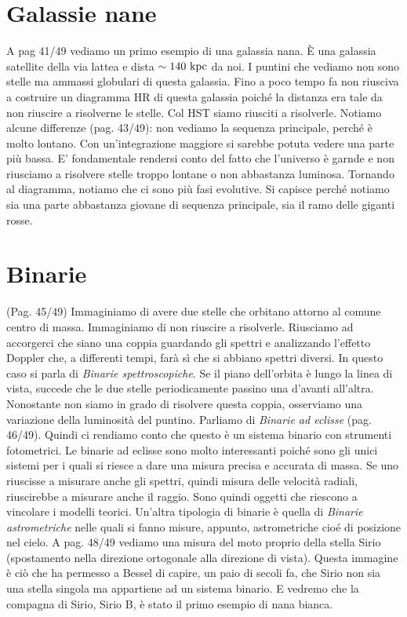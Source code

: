 \section*{Galassie nane}
A pag 41/49 vediamo un primo esempio di una galassia nana. È una galassia satellite della via lattea e dista $\sim 140\text{ kpc}$ da noi. I puntini che vediamo non sono stelle ma ammassi globulari di questa galassia. Fino a poco tempo fa non riusciva a costruire un diagramma HR di questa galassia poiché la distanza era tale da non riuscire a risolverne le stelle. Col HST siamo riusciti a risolverle. Notiamo alcune differenze (pag. 43/49): non vediamo la sequenza principale, perché è molto lontano. Con un'integrazione maggiore si sarebbe potuta vedere una parte più bassa. E' fondamentale rendersi conto del fatto che l'universo è garnde e non riusciamo a risolvere stelle troppo lontane o non abbastanza luminosa. Tornando al diagramma, notiamo che ci sono più fasi evolutive. Si capisce perché notiamo sia una parte abbastanza giovane di sequenza principale, sia il ramo delle giganti rosse. 

\section*{Binarie}
(Pag. 45/49) Immaginiamo di avere due stelle che orbitano attorno al comune centro di massa. Immaginiamo di non riuscire a risolverle. Riusciamo ad accorgerci che siano una coppia guardando gli spettri e analizzando l'effetto Doppler che, a differenti tempi, farà sì che si abbiano spettri diversi. In questo caso si parla di \textit{Binarie spettroscopiche}. Se il piano dell'orbita è lungo la linea di vista, succede che le due stelle periodicamente passino una d'avanti all'altra. Nonostante non siamo in grado di risolvere questa coppia, osserviamo una variazione della luminosità del puntino. Parliamo di \textit{Binarie ad eclisse} (pag. 46/49). Quindi ci rendiamo conto che questo è un sistema binario con strumenti fotometrici. Le binarie ad eclisse sono molto interessanti poiché sono gli unici sistemi per i quali si riesce a dare una misura precisa e accurata di massa. Se uno riuscisse a misurare anche gli spettri, quindi misura delle velocità radiali, riuscirebbe a misurare anche il raggio. Sono quindi oggetti che riescono a vincolare i modelli teorici. Un'altra tipologia di binarie è quella di \textit{Binarie astrometriche} nelle quali si fanno misure, appunto, astrometriche cioé di posizione nel cielo. A pag. 48/49 vediamo una misura del moto proprio della stella Sirio (spostamento nella direzione ortogonale alla direzione di vista). Questa immagine è ciò che ha permesso a Bessel di capire, un paio di secoli fa, che Sirio non sia una stella singola ma appartiene ad un sistema binario. E vedremo che la compagna di Sirio, Sirio B, è stato il primo esempio di nana bianca.